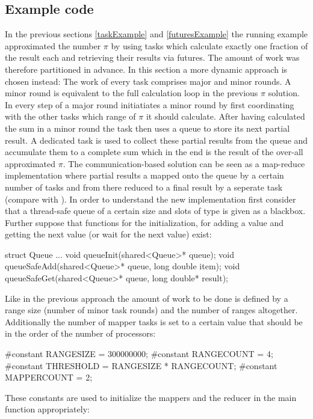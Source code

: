 \subsection{Example code}
\label{sharedMemoryExample}
In the previous sections \ref{taskExample} and \ref{futuresExample} the running example approximated the number $\pi$ by using tasks which calculate exactly one fraction of the result each and retrieving their results via futures. The amount of work was therefore partitioned in advance. In this section a more dynamic approach is chosen instead: The work of every task comprises major and minor rounds. A minor round is equivalent to the full calculation loop in the previous $\pi$ solution. In every step of a major round initiatiates a minor round by first coordinating with the other tasks which range of $\pi$ it should calculate. After having calculated the sum in a minor round the task then uses a queue to store its next partial result. A dedicated task is used to collect these partial results from the queue and accumulate them to a complete sum which in the end is the result of the over-all approximated $\pi$. The communication-based solution can be seen as a map-reduce implementation where partial results a mapped onto the queue by a certain number of tasks and from there reduced to a final result by a seperate task (compare with \cite{MapReduce}).
In order to understand the new implementation first consider that a thread-safe queue of a certain size and slots of type  is given as a blackbox. Further suppose that functions for the initialization, for adding a value and getting the next value (or wait for the next value) exist:
\begin{ccode}
struct Queue {...}
void queueInit(shared<Queue>* queue);
void queueSafeAdd(shared<Queue>* queue, long double item);
void queueSafeGet(shared<Queue>* queue, long double* result);
\end{ccode}
Like in the previous approach the amount of work to be done is defined by a range size (number of minor task rounds) and the number of ranges altogether. Additionally the number of mapper tasks is set to a certain value that should be in the order of the number of processors:
\begin{ccode}
#constant RANGESIZE = 300000000; 
#constant RANGECOUNT = 4; 
#constant THRESHOLD = RANGESIZE * RANGECOUNT; 
#constant MAPPERCOUNT = 2;
\end{ccode}
These constants are used to initialize the mappers and the reducer in the main function appropriately:
